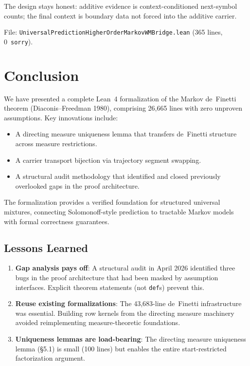 \documentclass[11pt,a4paper]{article}
\theoremstyle{definition}
\begin{document}
The design stays honest: additive evidence is context-conditioned next-symbol
counts; the final context is boundary data not forced into the additive carrier.

File: \texttt{UniversalPredictionHigherOrderMarkovWMBridge.lean} (365 lines, 0~\texttt{sorry}).

\section{Conclusion}

We have presented a complete Lean~4 formalization of the Markov de~Finetti
theorem (Diaconis--Freedman 1980), comprising 26,665 lines with zero unproven
assumptions. Key innovations include:

\begin{itemize}
\item A directing measure uniqueness lemma that transfers de~Finetti structure
  across measure restrictions.
\item A carrier transport bijection via trajectory segment swapping.
\item A structural audit methodology that identified and closed previously
  overlooked gaps in the proof architecture.
\end{itemize}

The formalization provides a verified foundation for structured universal
mixtures, connecting Solomonoff-style prediction to tractable Markov models
with formal correctness guarantees.

\subsection{Lessons Learned}

\begin{enumerate}
\item \textbf{Gap analysis pays off}: A structural audit in April 2026
  identified three bugs in the proof architecture that had been masked by
  assumption interfaces. Explicit theorem statements (not \texttt{def}s)
  prevent this.
\item \textbf{Reuse existing formalizations}: The 43,683-line de~Finetti
  infrastructure was essential. Building row kernels from the directing
  measure machinery avoided reimplementing measure-theoretic foundations.
\item \textbf{Uniqueness lemmas are load-bearing}: The directing measure
  uniqueness lemma (\S5.1) is small (100 lines) but enables the entire
  start-restricted factorization argument.
\end{enumerate}
\end{document}
